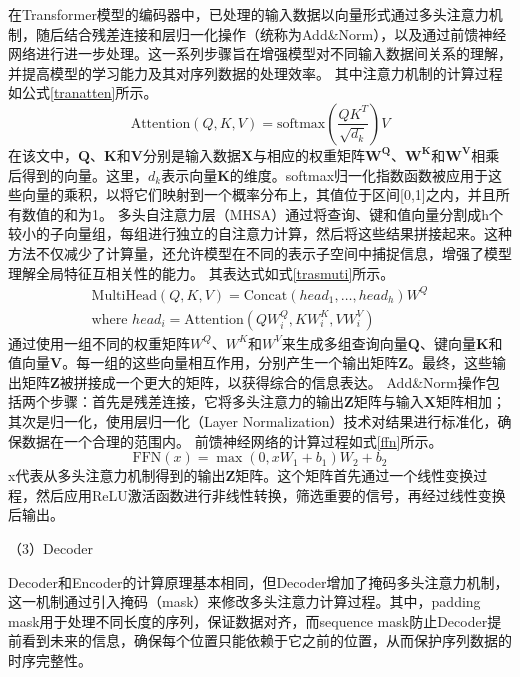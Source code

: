 在Transformer模型的编码器中，已处理的输入数据以向量形式通过多头注意力机制，随后结合残差连接和层归一化操作（统称为Add\&Norm），以及通过前馈神经网络进行进一步处理。这一系列步骤旨在增强模型对不同输入数据间关系的理解，并提高模型的学习能力及其对序列数据的处理效率。
其中注意力机制的计算过程如公式\eqref{tranatten}所示。
\begin{equation}
    \text{Attention}(Q,K,V) = \text{softmax}\left(\frac{QK^T}{\sqrt{d_k}}\right)V
    \label{tranatten}
\end{equation}
在该文中，\(\mathbf{Q}\)、\(\mathbf{K}\)和\(\mathbf{V}\)分别是输入数据\(\mathbf{X}\)与相应的权重矩阵\(\mathbf{W^Q}\)、\(\mathbf{W^K}\)和\(\mathbf{W^V}\)相乘后得到的向量。这里，\(d_k\)表示向量\(\mathbf{K}\)的维度。softmax归一化指数函数被应用于这些向量的乘积，以将它们映射到一个概率分布上，其值位于区间[0,1]之内，并且所有数值的和为1。
多头自注意力层（MHSA）通过将查询、键和值向量分割成h个较小的子向量组，每组进行独立的自注意力计算，然后将这些结果拼接起来。这种方法不仅减少了计算量，还允许模型在不同的表示子空间中捕捉信息，增强了模型理解全局特征互相关性的能力。
其表达式如式\eqref{trasmuti}所示。
\begin{equation}
    \begin{aligned}
        \text{MultiHead}(Q, K, V) = \text{Concat}(head_1, \ldots, head_h)W^Q \\
        \text{where } head_i = \text{Attention}(QW_i^Q, KW_i^K, VW_i^V)
        \label{trasmuti}
    \end{aligned}
\end{equation}
通过使用一组不同的权重矩阵\(W^Q\)、\(W^K\)和\(W^V\)来生成多组查询向量\(\mathbf{Q}\)、键向量\(\mathbf{K}\)和值向量\(\mathbf{V}\)。每一组的这些向量相互作用，分别产生一个输出矩阵\(\mathbf{Z}\)。最终，这些输出矩阵\(\mathbf{Z}\)被拼接成一个更大的矩阵，以获得综合的信息表达。   
Add\&Norm操作包括两个步骤：首先是残差连接，它将多头注意力的输出\(\mathbf{Z}\)矩阵与输入\(\mathbf{X}\)矩阵相加；其次是归一化，使用层归一化（Layer Normalization）技术对结果进行标准化，确保数据在一个合理的范围内。
前馈神经网络的计算过程如式\eqref{ffn}所示。
\begin{equation}
    \text{FFN}(x) = \max(0, xW_1 + b_1)W_2 + b_2
    \label{ffn}
\end{equation}
x代表从多头注意力机制得到的输出\(\mathbf{Z}\)矩阵。这个矩阵首先通过一个线性变换过程，然后应用ReLU激活函数进行非线性转换，筛选重要的信号，再经过线性变换后输出。

（3）Decoder 

Decoder和Encoder的计算原理基本相同，但Decoder增加了掩码多头注意力机制，这一机制通过引入掩码（mask）来修改多头注意力计算过程。其中，padding mask用于处理不同长度的序列，保证数据对齐，而sequence mask防止Decoder提前看到未来的信息，确保每个位置只能依赖于它之前的位置，从而保护序列数据的时序完整性。

